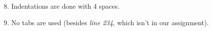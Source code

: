 \begin{itemize}
\item [8.] Indentations are done with 4 spaces.
\item [9.] No tabs are used (besides \textit{line 234}, which isn't in our assignment).
\end{itemize}